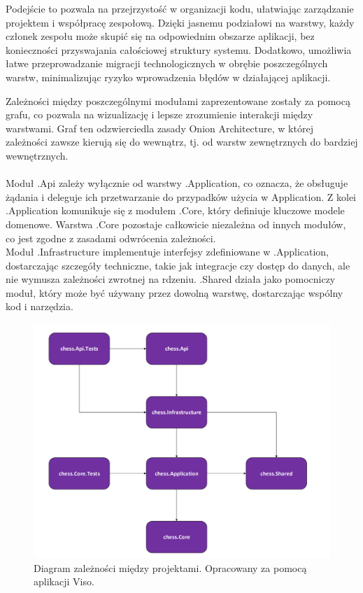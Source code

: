 \documentclass[12pt,a4paper]{article}
\begin{document}
\noindent
Podejście to pozwala na przejrzystość w organizacji kodu, ułatwiając zarządzanie projektem i współpracę zespołową. Dzięki jasnemu podziałowi na warstwy, każdy członek zespołu może skupić się na odpowiednim obszarze aplikacji, bez konieczności przyswajania całościowej struktury systemu. Dodatkowo, umożliwia łatwe przeprowadzanie migracji technologicznych w obrębie poszczególnych warstw, minimalizując ryzyko wprowadzenia błędów w działającej aplikacji.

\newpage

\noindent
Zależności między poszczególnymi modułami zaprezentowane zostały za pomocą grafu, co pozwala na wizualizację i lepsze zrozumienie interakcji między warstwami. Graf ten odzwierciedla zasady Onion Architecture, w której zależności zawsze kierują się do wewnątrz, tj. od warstw zewnętrznych do bardziej wewnętrznych.
\\\\
Moduł .Api zależy wyłącznie od warstwy .Application, co oznacza, że obsługuje żądania i deleguje ich przetwarzanie do przypadków użycia w Application. Z kolei .Application komunikuje się z modułem .Core, który definiuje kluczowe modele domenowe. Warstwa .Core pozostaje całkowicie niezależna od innych modułów, co jest zgodne z zasadami odwrócenia zależności.
\\
Moduł .Infrastructure implementuje interfejsy zdefiniowane w .Application, dostarczając szczegóły techniczne, takie jak integracje czy dostęp do danych, ale nie wymusza zależności zwrotnej na rdzeniu. .Shared działa jako pomocniczy moduł, który może być używany przez dowolną warstwę, dostarczając wspólny kod i narzędzia.

\begin{figure}[h!]
    \centering
    \includegraphics[width=1\textwidth]{images/diagram_dependencies.png}
    \caption{Diagram zależności między projektami. Opracowany za pomocą aplikacji Viso.}
\end{figure}
\end{document}
